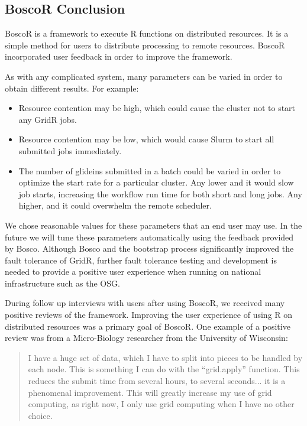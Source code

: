 \subsection{BoscoR Conclusion}

BoscoR is a framework to execute R functions on distributed resources.  It is a simple method for users to distribute processing to remote resources.  BoscoR incorporated user feedback in order to improve the framework.

As with any complicated system, many parameters can be varied in order to obtain different results.  For example:
\begin{itemize}
\item Resource contention may be high, which could cause the cluster not to start any GridR jobs.
\item Resource contention may be low, which would cause Slurm to start all submitted jobs immediately.
\item The number of glideins submitted in a batch could be varied in order to optimize the start rate for a particular cluster.  Any lower and it would slow job starts, increasing the workflow run time for both short and long jobs.  Any higher, and it could overwhelm the remote scheduler.
\end{itemize}

We chose reasonable values for these parameters that an end user may use.  In the future we will tune these parameters automatically using the feedback provided by Bosco.  Although Bosco and the bootstrap process significantly improved the fault tolerance of GridR, further fault tolerance testing and development is needed to provide a positive user experience when running on national infrastructure such as the OSG.

During follow up interviews with users after using BoscoR, we received many positive reviews of the framework.  Improving the user experience of using R on distributed resources was a primary goal of BoscoR.  One example of a positive review was from a Micro-Biology researcher from the University of Wisconsin:
\begin{quote}
I have a huge set of data, which I have to split into pieces to be handled by each node.  This is something I can do with the ``grid.apply'' function. This reduces the submit time from several hours, to several seconds... it is a  phenomenal improvement. This will greatly increase my use of grid computing, as right now, I only use grid computing when I have no other choice.
\end{quote}

